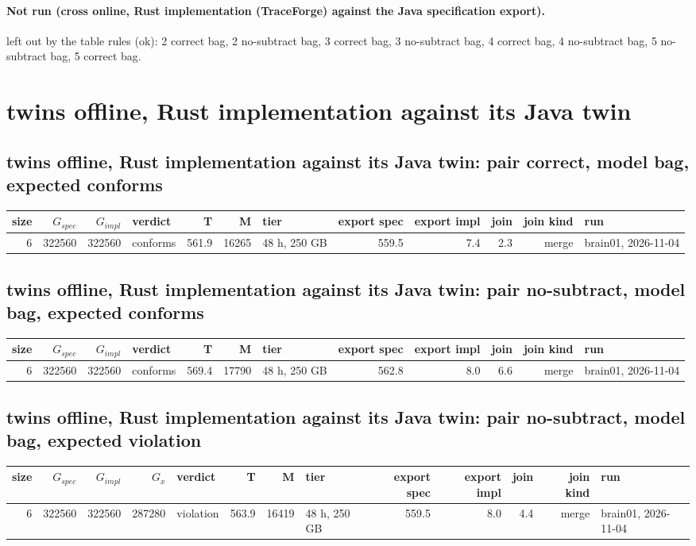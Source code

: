 \documentclass[10pt]{article}
\begin{document}
\paragraph{Not run (cross online, Rust implementation (TraceForge) against the Java specification export).}
left out by the table rules (ok): 2 correct bag, 2 no-subtract bag, 3 correct bag, 3 no-subtract bag, 4 correct bag, 4 no-subtract bag, 5 no-subtract bag, 5 correct bag.\par
\section*{twins offline, Rust implementation against its Java twin}
\subsection*{twins offline, Rust implementation against its Java twin: pair \textsf{correct}, model bag, expected conforms}
\begin{longtable}{@{}rrrlrrlrrrrl@{}}
\toprule
size & $G_{\mathit{spec}}$ & $G_{\mathit{impl}}$ & verdict & T & M & tier & export spec & export impl & join & join kind & run \\
\midrule
\endhead
\color{blue} 6 & 322560 & 322560 & conforms & 561.9 & 16265 & 48 h, 250 GB & 559.5 & 7.4 & 2.3 & merge & brain01, 2026-11-04 \\
\bottomrule
\end{longtable}
\subsection*{twins offline, Rust implementation against its Java twin: pair \textsf{no-subtract}, model bag, expected conforms}
\begin{longtable}{@{}rrrlrrlrrrrl@{}}
\toprule
size & $G_{\mathit{spec}}$ & $G_{\mathit{impl}}$ & verdict & T & M & tier & export spec & export impl & join & join kind & run \\
\midrule
\endhead
\color{blue} 6 & 322560 & 322560 & conforms & 569.4 & 17790 & 48 h, 250 GB & 562.8 & 8.0 & 6.6 & merge & brain01, 2026-11-04 \\
\bottomrule
\end{longtable}
\subsection*{twins offline, Rust implementation against its Java twin: pair \textsf{no-subtract}, model bag, expected violation}
\begin{longtable}{@{}rrrrlrrlrrrrl@{}}
\toprule
size & $G_{\mathit{spec}}$ & $G_{\mathit{impl}}$ & $G_x$ & verdict & T & M & tier & export spec & export impl & join & join kind & run \\
\midrule
\endhead
\color{blue} 6 & 322560 & 322560 & 287280 & violation & 563.9 & 16419 & 48 h, 250 GB & 559.5 & 8.0 & 4.4 & merge & brain01, 2026-11-04 \\
\bottomrule
\end{longtable}
\end{document}
